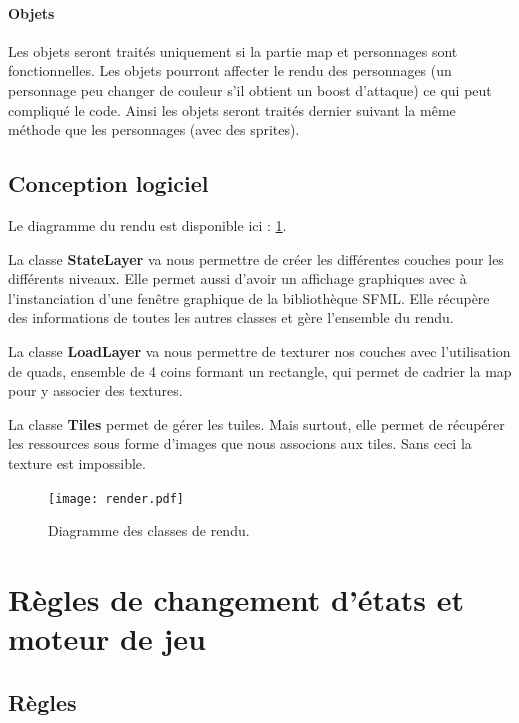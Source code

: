 \documentclass[a4paper,12pt]{article}
\begin{document}
\paragraph{Objets}
Les objets seront traités uniquement si la partie map et personnages sont fonctionnelles. Les objets pourront affecter le rendu des personnages (un personnage peu changer de couleur s'il obtient un boost d'attaque) ce qui peut compliqué le code. Ainsi les objets seront traités dernier suivant la même méthode que les personnages (avec des sprites).



\subsection{Conception logiciel}
Le diagramme du rendu est disponible ici : \ref{uml:render}.\\
\par
La classe \textbf{StateLayer} va nous permettre de créer les différentes couches pour les différents niveaux. Elle permet aussi d'avoir un affichage graphiques avec à l'instanciation d'une fenêtre graphique de la bibliothèque SFML. Elle récupère des informations de toutes les autres classes et gère l'ensemble du rendu.\\
\par
La classe \textbf{LoadLayer} va nous permettre de texturer nos couches avec l'utilisation de quads, ensemble de 4 coins formant un rectangle, qui permet de cadrier la map pour y associer des textures.\\
\par
La classe \textbf{Tiles} permet de gérer les tuiles. Mais surtout, elle permet de récupérer les ressources sous forme d'images que nous associons aux tiles. Sans ceci la texture est impossible.\\


\begin{landscape}
\begin{figure}[p]
\texttt{[image: render.pdf]}
\caption{\label{uml:render}Diagramme des classes de rendu.} 
\end{figure}
\end{landscape}

\clearpage
\section{Règles de changement d'états et moteur de jeu}

\subsection{Règles}
\end{document}
